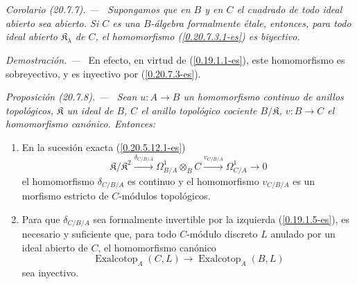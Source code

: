 \documentclass[10pt,oneside]{book}
\makeatletter
\newcommand{\sref}[1]{\textup{(\ref{#1})}}
\newcommand{\setmanualcurrentlabel}[1]{\def\@currentlabel{#1}}
\newenvironment{proposition}[1][]{%
  \setmanualcurrentlabel{#1}\par\medskip\noindent\itshape Proposición (#1). ---\ }{\par}
\newenvironment{corollary}[1][]{%
  \setmanualcurrentlabel{#1}\par\medskip\noindent\itshape Corolario (#1). ---\ }{\par}
\newenvironment{proof}{%
  \par\medskip\noindent\textit{Demostración. ---\ }}{\par}
\makeatother
\begin{document}
\begin{corollary}[20.7.7]
\label{0.20.7.7-es}
Supongamos que en $B$ y en $C$ el cuadrado de todo ideal abierto sea abierto.
Si $C$ es una $B$-álgebra formalmente étale, entonces, para todo ideal abierto
$\mathfrak K_\lambda$ de $C$, el homomorfismo \sref{0.20.7.3.1-es} es
biyectivo.
\end{corollary}

\begin{proof}
En efecto, en virtud de \sref{0.19.1.1-es}, este homomorfismo es sobreyectivo, y
es inyectivo por \sref{0.20.7.3-es}.
\end{proof}

\begin{proposition}[20.7.8]
\label{0.20.7.8-es}
Sean $u:A\to B$ un homomorfismo continuo de anillos topológicos,
$\mathfrak K$ un ideal de $B$, $C$ el anillo topológico cociente
$B/\mathfrak K$, $v:B\to C$ el homomorfismo canónico. Entonces:
\begin{enumerate}
  \item[\rm(i)] En la sucesión exacta \sref{0.20.5.12.1-es}
\[
  \mathfrak K/\mathfrak K^2\xrightarrow{\delta_{C/B/A}}
  \Omega^1_{B/A}\otimes_B C\xrightarrow{v_{C/B/A}}\Omega^1_{C/A}\to0
\]
el homomorfismo $\delta_{C/B/A}$ es continuo y el homomorfismo $v_{C/B/A}$
es un morfismo estricto de $C$-módulos topológicos.
  \item[\rm(ii)] Para que $\delta_{C/B/A}$ sea formalmente invertible por la
izquierda \sref{0.19.1.5-es}, es necesario y suficiente que, para todo $C$-módulo
discreto $L$ anulado por un ideal abierto de $C$, el homomorfismo canónico
\begin{equation}
\tag{20.7.8.1}
\label{0.20.7.8.1-es}
  \operatorname{Exalcotop}_A(C,L)\to\operatorname{Exalcotop}_A(B,L)
\end{equation}
sea inyectivo.
\end{enumerate}
\end{proposition}
\end{document}
